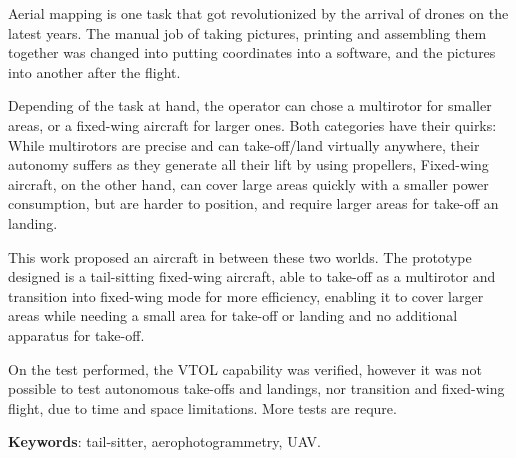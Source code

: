 \begin{resumo}[Abstract]

Aerial mapping is one task that got revolutionized by the arrival of drones on the latest years. The manual job of taking pictures, printing and assembling them together was changed into putting coordinates into a software, and the pictures into another after the flight.

Depending of the task at hand, the operator can chose a multirotor for smaller areas, or a fixed-wing aircraft for larger ones. Both categories have their quirks: While multirotors are precise and can take-off/land virtually anywhere, their autonomy suffers as they generate all their lift by using propellers, Fixed-wing aircraft, on the other hand, can cover large areas quickly with a smaller power consumption, but are harder to position, and require larger areas for take-off an landing.
 
This work proposed an aircraft in between these two worlds. The prototype designed is a tail-sitting fixed-wing aircraft, able to take-off as a multirotor and transition into fixed-wing mode for more efficiency, enabling it to cover larger areas while needing a small area for take-off or landing and no additional apparatus for take-off.	

On the test performed, the VTOL capability was verified, however it was not possible to test autonomous take-offs and landings, nor transition and fixed-wing flight, due to time and space limitations. More tests are requre.

   \vspace{\onelineskip}
 
   \noindent 
   \textbf{Keywords}: tail-sitter, aerophotogrammetry, UAV.

\end{resumo}
